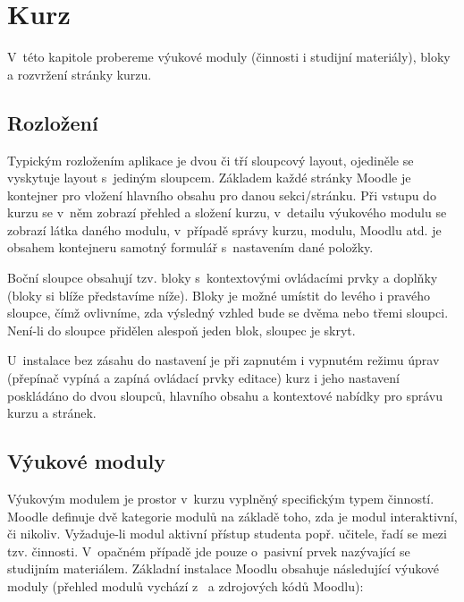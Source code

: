 \documentclass[
print,
  11pt,
  table,   
  nolof,    
  nolot,
  oneside,final
]{fithesis3}
\begin{document}
	\section{Kurz}
V~této kapitole probereme výukové moduly (činnosti i studijní materiály), bloky a rozvržení stránky kurzu.  
		\subsection{Rozložení}
Typickým rozložením aplikace je dvou či tří sloupcový layout, ojediněle se vyskytuje layout s~jediným sloupcem. Základem každé stránky Moodle je kontejner pro vložení hlavního obsahu pro danou sekci/stránku. Při vstupu do kurzu se v~něm zobrazí přehled a složení kurzu, v~detailu výukového modulu se zobrazí látka daného modulu, v~případě správy kurzu, modulu, Moodlu atd. je obsahem kontejneru samotný formulář s~nastavením dané položky.

Boční sloupce obsahují tzv. bloky s~kontextovými ovládacími prvky a doplňky (bloky si blíže představíme níže). Bloky je možné umístit do levého i pravého sloupce, čímž ovlivníme, zda výsledný vzhled bude se dvěma nebo třemi sloupci. Není-li do sloupce přidělen alespoň jeden blok, sloupec je skryt. 

U~instalace bez zásahu do nastavení je při zapnutém i vypnutém režimu úprav (přepínač vypíná a zapíná ovládací prvky editace) kurz i jeho nastavení poskládáno do dvou sloupců, hlavního obsahu a kontextové nabídky pro správu kurzu a stránek.

		\subsection{Výukové moduly}
Výukovým modulem je prostor v~kurzu vyplněný specifickým typem činností. Moodle definuje dvě kategorie modulů na základě toho, zda je modul interaktivní, či nikoliv. Vyžaduje-li modul aktivní přístup studenta popř. učitele, řadí se mezi tzv. činnosti. V~opačném případě jde pouze o~pasivní prvek nazývající se studijním materiálem.
Základní instalace Moodlu obsahuje následující výukové moduly (přehled modulů vychází z~\cite{drlik} a zdrojových kódů Moodlu): 
\end{document}
